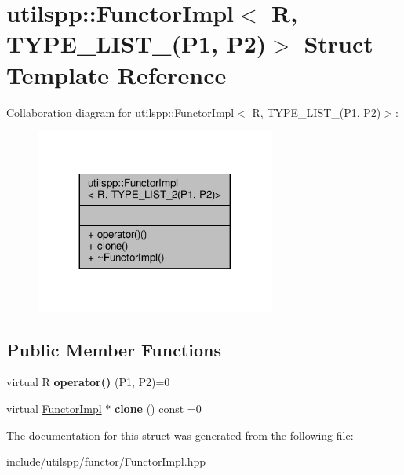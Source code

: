 \hypertarget{structutilspp_1_1FunctorImpl_3_01R_00_01TYPE__LIST__2_07P1_00_01P2_08_4}{\section{utilspp\-:\-:Functor\-Impl$<$ R, T\-Y\-P\-E\-\_\-\-L\-I\-S\-T\-\_(P1, P2)$>$ Struct Template Reference}
\label{structutilspp_1_1FunctorImpl_3_01R_00_01TYPE__LIST__2_07P1_00_01P2_08_4}
}


Collaboration diagram for utilspp\-:\-:Functor\-Impl$<$ R, T\-Y\-P\-E\-\_\-\-L\-I\-S\-T\-\_(P1, P2)$>$\-:\nopagebreak
\begin{figure}[H]
\begin{center}
\leavevmode
\includegraphics[width=224pt]{structutilspp_1_1FunctorImpl_3_01R_00_01TYPE__LIST__2_07P1_00_01P2_08_4__coll__graph}
\end{center}
\end{figure}
\subsection*{Public Member Functions}
\begin{DoxyCompactItemize}
\item 
\hypertarget{structutilspp_1_1FunctorImpl_3_01R_00_01TYPE__LIST__2_07P1_00_01P2_08_4_a6c37e9ecec518bb01543781b67143407}{virtual R {\bfseries operator()} (P1, P2)=0}\label{structutilspp_1_1FunctorImpl_3_01R_00_01TYPE__LIST__2_07P1_00_01P2_08_4_a6c37e9ecec518bb01543781b67143407}

\item 
\hypertarget{structutilspp_1_1FunctorImpl_3_01R_00_01TYPE__LIST__2_07P1_00_01P2_08_4_adfacdb673233ca72f4a2bd4a811546a8}{virtual \hyperlink{structutilspp_1_1FunctorImpl}{Functor\-Impl} $\ast$ {\bfseries clone} () const =0}\label{structutilspp_1_1FunctorImpl_3_01R_00_01TYPE__LIST__2_07P1_00_01P2_08_4_adfacdb673233ca72f4a2bd4a811546a8}

\end{DoxyCompactItemize}


The documentation for this struct was generated from the following file\-:\begin{DoxyCompactItemize}
\item 
include/utilspp/functor/Functor\-Impl.\-hpp\end{DoxyCompactItemize}
